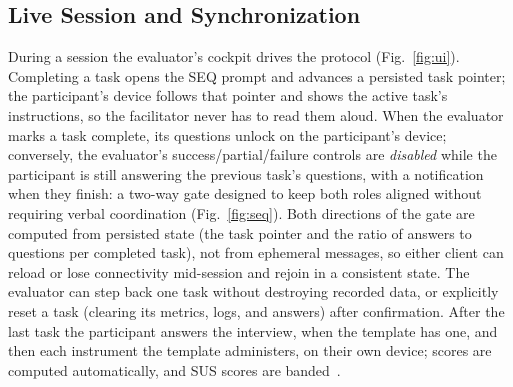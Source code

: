 \documentclass[conference]{IEEEtran}
\begin{document}
\subsection{Live Session and Synchronization}
During a session the evaluator's cockpit drives the protocol
(Fig.~\ref{fig:ui}). Completing a task opens the SEQ prompt and advances a
persisted task pointer; the participant's device follows that pointer and
shows the active task's instructions, so the facilitator never has to read
them aloud. When the evaluator marks a task complete, its questions unlock
on the participant's device; conversely, the evaluator's
success/partial/failure controls are \emph{disabled} while the participant
is still answering the previous task's questions, with a notification when
they finish: a two-way gate designed to keep both roles aligned without
requiring verbal coordination (Fig.~\ref{fig:seq}). Both directions of the gate are
computed from persisted state (the task pointer and the ratio of answers
to questions per completed task), not from ephemeral messages, so either
client can reload or lose connectivity mid-session and rejoin in a
consistent state. The evaluator can step back one task without destroying
recorded data, or explicitly reset a task (clearing its metrics, logs, and
answers) after confirmation. After the last task the participant answers
the interview, when the template has one, and then each instrument the
template administers, on their own device; scores are computed
automatically, and SUS scores are banded~\cite{bangor2009determining,
sauro2011practical}.
\end{document}
